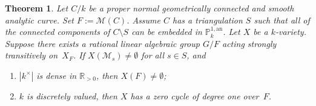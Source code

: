 \documentclass[JEP,XML,SOM,Unicode,NoFloatCountersInSection,published]{cedram}
\let\backslash\setminus
\newtheorem{thm}{Theorem}[section]
\theoremstyle{definition}
\begin{document}
\begin{thm} \label{5.6} Let $C/k$ be a proper normal geometrically connected and smooth analytic curve. Set $F:=\mathscr{M}(C)$.
Assume $C$ has a triangulation $S$ such that all of the connected components of $C \backslash S$ can be embedded in $\mathbb{P}_k^{1, \mathrm{an}}$. Let $X$ be a $k$-variety. Suppose there exists a rational linear algebraic group $G/F$ acting strongly transitively on~$X_F$.
If $X(\mathscr{M}_{s}) \neq \emptyset$ for all $s \in S$, and
\begin{enumerate}
\item $|k^{\times}|$ is dense in $\mathbb{R}_{>0}$, then $X(F) \neq \emptyset$;
\item $k$ is discretely valued, then $X$ has a zero cycle of degree one over~$F$.
\end{enumerate}
\end{thm}
\end{document}
